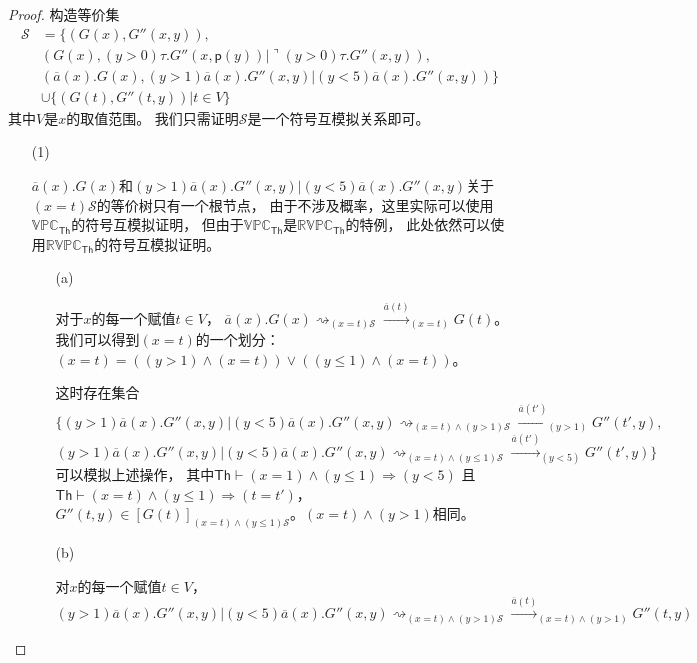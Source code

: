 \begin{proof}
   构造等价集
   \begin{equation}
      \begin{split}
      \mathcal{S} &= \{(G(x),G''(x,y)),\\
      &(G(x),(y>0)\tau.G''(x,\mathsf{p}(y))|\urcorner (y>0)\tau.G''(x,y)),\\
      &(\overline{a}(x).G(x),(y>1)\overline{a}(x).G''(x,y)|(y<5)\overline{a}(x).G''(x,y))\}\\
      &\cup \{(G(t),G''(t,y))|t\in V\}
      \end{split}
   \end{equation}
   其中$V$是$x$的取值范围。
   我们只需证明$\mathcal{S}$是一个符号互模拟关系即可。
   \begin{itemize}
      \item[(1)] {
         $\overline{a}(x).G(x)$和$(y>1)\overline{a}(x).G''(x,y)|(y<5)\overline{a}(x).G''(x,y)$关于$(x=t)\mathcal{S}$的等价树只有一个根节点，
         由于不涉及概率，这里实际可以使用$\mathbb{VPC}_{\mathsf{Th}}$的符号互模拟证明，
         但由于$\mathbb{VPC}_{\mathsf{Th}}$是$\mathbb{RVPC}_{\mathsf{Th}}$的特例，
         此处依然可以使用$\mathbb{RVPC}_{\mathsf{Th}}$的符号互模拟证明。
         \begin{itemize}
            \item[(a)] {
               对于$x$的每一个赋值$t\in V$，
               $\overline{a}(x).G(x)\rightsquigarrow_{(x=t)\mathcal{S}}\stackrel{\overline{a}(t)}{\longrightarrow}_{(x=t)}G(t)$。
               我们可以得到$(x=t)$的一个划分：$(x=t)=((y>1)\wedge (x=t))\vee ((y\leq 1)\wedge (x=t))$。
      
               这时存在集合
               $$\{(y>1)\overline{a}(x).G''(x,y)|(y<5)\overline{a}(x).G''(x,y)\rightsquigarrow_{(x=t)\wedge(y>1)\mathcal{S}}\stackrel{\overline{a}(t')}{\rightarrow}_{(y>1)}G''(t',y),$$
               $$(y>1)\overline{a}(x).G''(x,y)|(y<5)\overline{a}(x).G''(x,y)\rightsquigarrow_{(x=t)\wedge(y\leq 1)\mathcal{S}}\stackrel{\overline{a}(t')}{\rightarrow}_{(y<5)}G''(t',y)\}$$
               可以模拟上述操作，
               其中$\mathsf{Th}\vdash(x=1)\wedge(y\leq 1)\Rightarrow (y<5)$
               且$\mathsf{Th}\vdash (x=t)\wedge (y\leq 1)\Rightarrow (t=t')$，
               $G''(t,y)\in[G(t)]_{(x=t)\wedge(y\leq 1)\mathcal{S}}$。$(x=t)\wedge(y>1)$相同。
            }
            \item[(b)] {
               对$x$的每一个赋值$t\in V$，
               $$(y>1)\overline{a}(x).G''(x,y)|(y<5)\overline{a}(x).G''(x,y)\rightsquigarrow_{(x=t)\wedge(y>1)\mathcal{S}}\stackrel{\overline{a}(t)}{\rightarrow}_{(x=t)\wedge(y>1)}G''(t,y)$$
               
}
\end{itemize}}
\end{itemize}
\end{proof}

